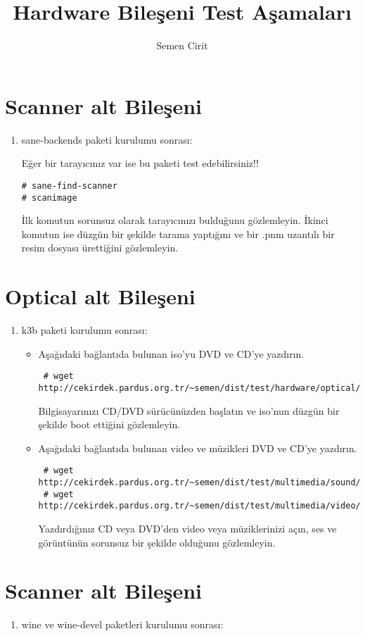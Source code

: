 \documentclass[a4paper,10pt]{article}
\title{Hardware Bileşeni Test Aşamaları}
\author{Semen Cirit}
\begin{document}
\maketitle

\section{Scanner alt Bileşeni}
\begin{enumerate}
\item sane-backends paketi kurulumu sonrası:

Eğer bir tarayıcınız var ise bu paketi test edebilirsiniz!!
\begin{verbatim}
# sane-find-scanner
# scanimage 
\end{verbatim}

İlk komutun sorunsuz olarak tarayıcınızı bulduğunu gözlemleyin.
İkinci komutun ise düzgün bir şekilde tarama yaptığını ve bir .pnm uzantılı bir resim dosyası ürettiğini gözlemleyin.
\end{enumerate}

\section{Optical alt Bileşeni}
\begin{enumerate}
 \item k3b paketi kurulumu sonrası:
\begin{itemize}
\item Aşağıdaki bağlantıda bulunan iso'yu DVD ve CD'ye yazdırın. 
\begin{verbatim}
 # wget http://cekirdek.pardus.org.tr/~semen/dist/test/hardware/optical/boot.iso
\end{verbatim}

Bilgisayarınızı CD/DVD sürücünüzden başlatın ve iso'nun düzgün bir şekilde boot ettiğini gözlemleyin.

\item Aşağıdaki bağlantıda bulunan video ve müzikleri DVD ve CD'ye yazdırın. 
\begin{verbatim}
 # wget http://cekirdek.pardus.org.tr/~semen/dist/test/multimedia/sound/sound.tar
 # wget http://cekirdek.pardus.org.tr/~semen/dist/test/multimedia/video/cokluortam.tar
\end{verbatim}
Yazdırdığınız CD veya DVD'den video veya müziklerinizi açın, ses ve görüntünün sorunsuz bir şekilde olduğunu gözlemleyin.

\end{itemize}

\end{enumerate}
\section{Scanner alt Bileşeni}
\begin{enumerate}
 \item wine ve wine-devel paketleri kurulumu sonrası:

\end{enumerate}
\end{document}

